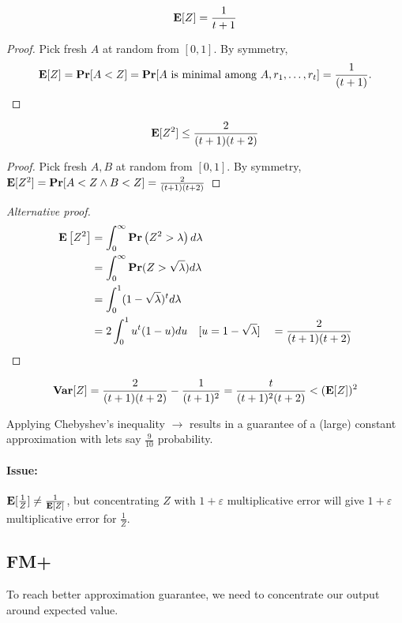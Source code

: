 \documentclass[11pt]{article}
\begin{document}
\begin{lemma}
\begin{equation}
    \mathbf{E}[Z] = \frac{1}{t+1}
\end{equation}
\end{lemma}
\begin{proof}
Pick fresh $A$ at random from $[0,1]$. By symmetry, 
$$\mathbf{E}[Z] = \mathbf{Pr}[A<Z] = \mathbf{Pr}[A\text{ is minimal among }{A,r_1,\dots,r_t}] = \frac{1}{(t+1)}.$$
\end{proof}
\begin{lemma}
\begin{equation}
\mathbf{E}[Z^2] \leq \frac{2}{(t+1)(t+2)}
\end{equation}
\end{lemma}
\begin{proof}
Pick fresh $A, B$ at random from $[0, 1]$. By symmetry, $\mathbf{E}[Z^2] = \mathbf{Pr}[A<Z \wedge B<Z] = \frac{2}{(t+1)(t+2)}$ 
\end{proof}
\begin{proof}[Alternative proof]
\begin{align*}
\mathbf{E}\left[Z^{2}\right] &=\int_{0}^{\infty} \mathbf{Pr}\left(Z^{2}>\lambda\right) d \lambda \\
&=\int_{0}^{\infty} \mathbf{Pr}(Z>\sqrt{\lambda}) d \lambda \\
&=\int_{0}^{1}(1-\sqrt{\lambda})^{t} d \lambda \\
&=2 \int_{0}^{1} u^{t}(1-u) d u \quad[u=1-\sqrt{\lambda}] \quad=\frac{2}{(t+1)(t+2)} \end{align*}
\end{proof}
\begin{equation}
\mathbf{Var}[Z]=\frac{2}{(t+1)(t+2)}-\frac{1}{(t+1)^{2}}=\frac{t}{(t+1)^{2}(t+2)}<(\mathbf{E}[Z])^{2}
\end{equation}

\begin{remark}
Applying Chebyshev's inequality $\rightarrow$ results in a guarantee of a (large) constant approximation with lets say $\frac{9}{10}$ probability.
\end{remark}

\paragraph{Issue:} $\mathbf{E}[\frac{1}{Z}] \neq \frac{1}{\mathbf{E}[Z]}$, but concentrating $Z$ with $1+\varepsilon$ multiplicative error will give $1+\varepsilon$ multiplicative error for $\frac{1}{Z}$.

\subsection{FM+}
To reach better approximation guarantee, we need to concentrate our output around expected value.
\end{document}
